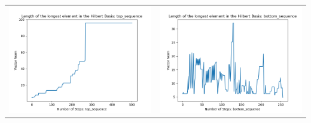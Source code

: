 \documentclass[10pt]{article}
\begin{document}
\begin{tabular}{c|c}
\begin{minipage}{.4\textwidth}
\includegraphics[width=\textwidth]{"DATA/4d/5 generators 2 bound J/top_sequence LENGTH"}
\end{minipage} &
\begin{minipage}{.4\textwidth}
\includegraphics[width=\textwidth]{"DATA/4d/5 generators 2 bound J bottomup/bottom_sequence LENGTH"}
\end{minipage}
\end{tabular}
\end{document}
